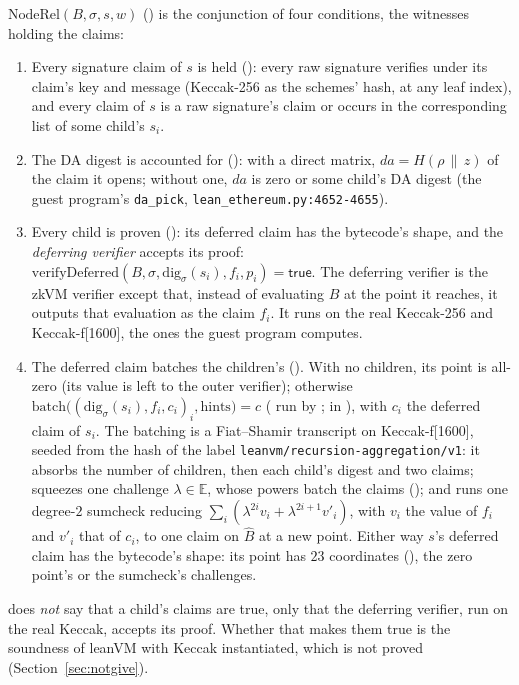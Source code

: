 \documentclass[11pt]{article}
\begin{document}
$\mathrm{NodeRel}(B, \sigma, s, w)$ () is the conjunction of four conditions,
the witnesses holding the claims:
\begin{enumerate}
\item Every signature claim of $s$ is held (): every raw signature verifies
under its claim's key and message (Keccak-256 as the schemes' hash, at any leaf index), and every
claim of $s$ is a raw signature's claim or occurs in the corresponding list of some child's $s_i$.
\item The DA digest is accounted for (): with a direct matrix,
$\mathit{da} = H(\rho \,\|\, z)$ of the claim it opens; without one, $\mathit{da}$ is zero or
some child's DA digest (the guest program's \texttt{da\_pick}, \texttt{lean\_ethereum.py:4652-4655}).
\item Every child is proven (): its deferred claim has the bytecode's shape,
and the \emph{deferring verifier} accepts its proof: $\mathrm{verifyDeferred}(B, \sigma,
\mathrm{dig}_\sigma(s_i), f_i, p_i) = \mathsf{true}$. The deferring verifier is the zkVM verifier
except that, instead of evaluating $\widehat{B}$ at the point it reaches, it outputs that evaluation
as the claim $f_i$. It runs on the real Keccak-256 and Keccak-f[1600], the ones the guest program
computes.
\item The deferred claim batches the children's (). With no children, its
point is all-zero (its value is left to the outer verifier); otherwise $\mathrm{batch}\big(
(\mathrm{dig}_\sigma(s_i), f_i, c_i)_i, \text{hints}\big) = c$ ( run by
;  in ), with $c_i$ the deferred claim of $s_i$. The
batching is a Fiat--Shamir transcript on Keccak-f[1600], seeded from the hash of the label
\texttt{leanvm/recursion-aggregation/v1}: it absorbs the number of children, then each child's
digest and two claims; squeezes one challenge $\lambda \in \mathbb{E}$, whose powers batch the
claims (); and runs one degree-$2$ sumcheck reducing
$\sum_i (\lambda^{2i} v_i + \lambda^{2i+1} v'_i)$, with $v_i$
the value of $f_i$ and $v'_i$ that of $c_i$, to one claim on $\widehat{B}$ at a new point.
Either way $s$'s deferred claim has the bytecode's shape: its point has $23$ coordinates
(), the zero point's or the sumcheck's challenges.
\end{enumerate}
 does \emph{not} say that a child's claims are true, only that the deferring verifier,
run on the real Keccak, accepts its proof. Whether that makes them true is the soundness of leanVM
with Keccak instantiated, which is not proved (Section~\ref{sec:notgive}).
\end{document}
